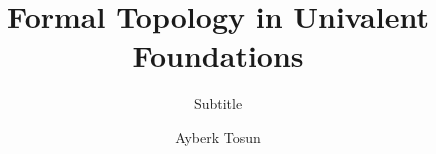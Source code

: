 

\title{Formal Topology in Univalent Foundations}
\subtitle{Subtitle}
\author{Ayberk Tosun}





\newcommand{\reals}{\mathbb{R}}
\newcommand{\nats}{\mathbb{N}}
\newcommand{\bool}{\mathbf{Bool}}
\newcommand{\ball}[2]{\mathfrak{A}(#1, #2)}
\newcommand{\neighbourhood}[1]{\mathbf{N}(#1)}

\newcommand{\pity}[3]{\prod_{(#1~:~#2)} #3}
\newcommand{\sigmaty}[3]{\sum_{(#1~:~#2)} #3}
\newcommand{\univ}{\mathcal{U}}
\newcommand{\isaprop}[1]{\mathsf{IsProp}\left(#1\right)}
\newcommand{\isaset}[1]{\mathsf{IsSet}\left(#1\right)}
\newcommand{\abs}[1]{\left| #1 \right|}
\newcommand{\trunc}[1]{\left\| #1 \right\|}
\newcommand{\pow}[1]{\mathcal{P}\left(#1\right)}
\newcommand{\sub}[1]{\mathsf{Fam}\left(#1\right)}
\newcommand{\indexnm}{\mathsf{index}}
\newcommand{\indexset}[1]{\indexnm{}\left(#1\right)}
\newcommand{\pair}[2]{\langle #1 , #2 \rangle}

\newcommand{\dcsubsetnm}{\mathsf{DCSubset}}
\newcommand{\dcsubset}[1]{\dcsubsetnm{}\left(#1\right)}

\newcommand{\ordernm}{\mathsf{Order}}
\newcommand{\order}[1]{\ordernm{}\left(#1\right)}

\newcommand{\posetstrnm}{\mathsf{PosetStr}}
\newcommand{\posetstr}[1]{\posetstrnm{}\left(#1\right)}

\newcommand{\posetaxnm}{\mathsf{PosetAx}}
\newcommand{\posetax}[1]{\posetaxnm{}\left(#1\right)}

\newcommand{\ismonotonicnm}{\mathsf{IsMonotonic}}
\newcommand{\ismonotonic}[1]{\ismonotonicnm{}\left(#1\right)}

\newcommand{\monotonicmapnm}{\rightarrow_m}
\newcommand{\monotonicmap}[2]{#1 \rightarrow_m #2}

\newcommand{\framestrnm}{\mathsf{FrameStr}}
\newcommand{\framestr}[1]{\framestrnm{}\left(#1\right)}
\newcommand{\frameax}[1]{\mathsf{FrameAx}\left(#1\right)}

\newcommand{\rawframestrnm}{\mathsf{RawFrameStr}}
\newcommand{\rawframestr}[1]{\rawframestrnm{}\left(#1\right)}


